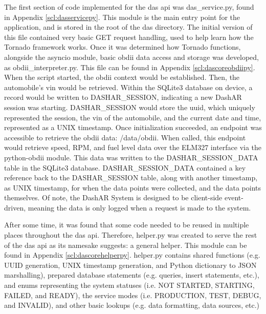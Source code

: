             \par The first section of code implemented for the \gls{das} \gls{api} was das\_service.py, found in Appendix \ref{scl:dasservicepy}. This module is the main entry point for the application, and is stored in the root of the \gls{das} directory. The initial version of this file contained very basic GET request handling, used to help learn how the Tornado framework works. Once it was determined how Tornado functions, alongside the asyncio module, basic \gls{obdii} data access and storage was developed, as obdii\_interpreter.py. This file can be found in Appendix \ref{scl:dascoreobdiipy}. When the script started, the \gls{obdii} context would be established. Then, the automobile's \gls{vin} would be retrieved. Within the SQLite3 database on device, a record would be written to DASHAR\_SESSION, indicating a new DashAR session was starting. DASHAR\_SESSION would store the \gls{uuid}, which uniquely represented the session, the \gls{vin} of the automobile, and the current date and time, represented as a UNIX timestamp. Once initialization succeeded, an endpoint was accessible to retrieve the \gls{obdii} data: /data/obdii. When called, this endpoint would retrieve speed, RPM, and fuel level data over the ELM327 interface via the python-obdii module. This data was written to the DASHAR\_SESSION\_DATA table in the SQLite3 database. DASHAR\_SESSION\_DATA contained a key reference back to the DASHAR\_SESSION table, along with another timestamp, as UNIX timestamp, for when the data points were collected, and the data points themselves. Of note, the DashAR System is designed to be client-side event-driven, meaning the data is only logged when a request is made to the system.

            \par After some time, it was found that some code needed to be reused in multiple places throughout the \gls{das} \gls{api}. Therefore, helper.py was created to serve the rest of the \gls{das} \gls{api} as its namesake suggests: a general helper. This module can be found in Appendix \ref{scl:dascorehelperpy}. helper.py contains shared functions (e.g. UUID generation, UNIX timestamp generation, and Python dictionary to JSON marshalling), prepared database statements (e.g. queries, insert statements, etc.), and enums representing the system statuses (i.e. NOT STARTED, STARTING, FAILED, and READY), the service modes (i.e. PRODUCTION, TEST, DEBUG, and INVALID), and other basic lookups (e.g. data formatting, data sources, etc.)

